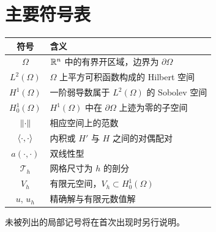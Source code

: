 \chapter*{主要符号表}

\begin{center}
\begin{tabular}{cl}
\toprule
符号 & 含义 \\
\midrule
$\Omega$               & $\mathbb{R}^n$ 中的有界开区域，边界为 $\partial\Omega$ \\
$L^2(\Omega)$          & $\Omega$ 上平方可积函数构成的 Hilbert 空间 \\
$H^1(\Omega)$          & 一阶弱导数属于 $L^2(\Omega)$ 的 Sobolev 空间 \\
$H_0^1(\Omega)$        & $H^1(\Omega)$ 中在 $\partial\Omega$ 上迹为零的子空间 \\
$\left\lVert \cdot\right\rVert$         & 相应空间上的范数 \\
$\left\langle \cdot,\cdot\right\rangle$ & 内积或 $H'$ 与 $H$ 之间的对偶配对 \\
$a(\cdot,\cdot)$       & 双线性型 \\
$\mathcal{T}_h$        & 网格尺寸为 $h$ 的剖分 \\
$V_h$                  & 有限元空间，$V_h\subset H_0^1(\Omega)$ \\
$u,\,u_h$              & 精确解与有限元数值解 \\
\bottomrule
\end{tabular}
\end{center}

\noindent 未被列出的局部记号将在首次出现时另行说明。
